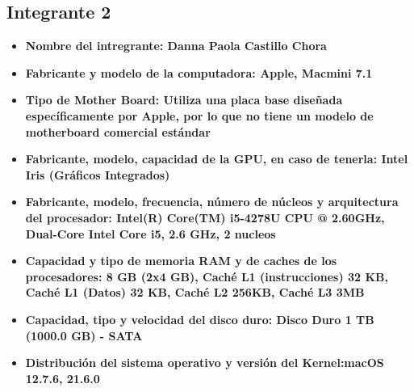 \documentclass[12pt]{article}
\newcommand{\pl}[1]{\item \textbf{ #1 }}
\begin{document}
\subsection{Integrante 2}
\begin{itemize}
    \pl{Nombre del intregrante: Danna Paola Castillo Chora}

    \pl{Fabricante y modelo de la computadora: Apple, Macmini 7.1}

    \pl{Tipo de Mother Board: Utiliza una placa base diseñada específicamente por Apple, por lo que no tiene un modelo de motherboard comercial estándar}

    \pl{Fabricante, modelo, capacidad de la GPU, en caso de tenerla: Intel Iris (Gráficos Integrados)}

    \pl{Fabricante, modelo, frecuencia, número de núcleos y arquitectura del procesador: Intel(R) Core(TM) i5-4278U CPU @ 2.60GHz, Dual-Core Intel Core i5, 2.6 GHz, 2 nucleos}

    \pl{Capacidad y tipo de memoria RAM y de caches de los procesadores: 8 GB (2x4 GB), Caché L1 (instrucciones) 32 KB, Caché L1 (Datos) 32 KB, Caché L2 256KB, Caché L3 3MB}

    \pl{Capacidad, tipo y velocidad del disco duro: Disco Duro
1 TB (1000.0 GB) - SATA}

    \pl{Distribución del sistema operativo y versión del Kernel:macOS 12.7.6, 21.6.0}
\end{itemize}
\end{document}
